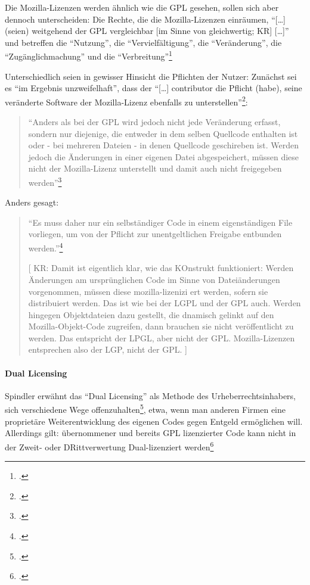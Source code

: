 \documentclass[DIV=calc,BCOR=5mm,11pt,headings=small,oneside,abstract=true, toc=bib]{scrartcl}
\begin{document}
Die Mozilla-Lizenzen werden ähnlich wie die GPL gesehen, sollen sich aber
dennoch unterscheiden: Die Rechte, die die Mozilla-Lizenzen einräumen,
\enquote{[\ldots] (seien) weitgehend der GPL vergleichbar [im Sinne von
gleichwertig; KR] [\ldots]} und betreffen die \enquote{Nutzung},
die \enquote{Vervielfältigung}, die \enquote{Veränderung}, die
\enquote{Zugänglichmachung} und die
\enquote{Verbreitung}\footcite[vgl.][14]{Spindler2004a}

Unterschiedlich seien in gewisser Hinsicht die Pflichten der Nutzer: Zunächst
sei es \enquote{im Ergebnis unzweifelhaft}, dass der \enquote{[\ldots]
contributor die Pflicht (habe), seine veränderte Software der
Mozilla-Lizenz ebenfalls zu
unterstellen}\footcite[vgl.][15]{Spindler2004a}:
\begin{quote}\enquote{Anders als bei der GPL wird jedoch nicht jede
Veränderung erfasst, sondern nur diejenige, die entweder in dem selben
Quellcode enthalten ist oder - bei mehreren Dateien - in denen Quellcode
geschireben ist. Werden jedoch die Änderungen in einer eigenen Datei
abgespeichert, müssen diese nicht der Mozilla-Lizenz unterstellt und
damit auch nicht freigegeben werden}\footcite[][15]{Spindler2004a}
\end{quote}

Anders gesagt:

\begin{quote}\enquote{Es muss daher nur ein selbständiger Code in einem
eigenständigen File vorliegen, um von der Pflicht zur unentgeltlichen
Freigabe entbunden werden.}\footcite[][15]{Spindler2004a}

[ KR: Damit ist eigentlich klar, wie das KOnstrukt funktioniert: Werden
Änderungen am ursprünglichen Code im Sinne von Dateiänderungen vorgenommen,
müssen diese mozilla-lizenizi
ert werden, sofern sie distribuiert werden. Das ist
wie bei der LGPL und der GPL auch. Werden hingegen Objektdateien dazu gestellt,
die dnamisch gelinkt auf den Mozilla-Objekt-Code zugreifen, dann brauchen sie
nicht veröffentlicht zu werden. Das entspricht der LPGL, aber nicht der GPL.
Mozilla-Lizenzen entsprechen also der LGP, nicht der GPL. ]
\end{quote}

\paragraph{Dual Licensing}


Spindler erwähnt das \enquote{Dual Licensing} als Methode des
Urheberrechtsinhabers, sich verschiedene Wege
offenzuhalten\footcite[vgl.][16]{Spindler2004a}, etwa, wenn man anderen Firmen
eine proprietäre Weiterentwicklung des eigenen Codes gegen Entgeld ermöglichen
will. Allerdings gilt: übernommener und bereits GPL lizenzierter Code kann nicht
in der Zweit- oder DRittverwertung Dual-lizenziert
werden\footcite[vgl.][17]{Spindler2004a}
\end{document}
